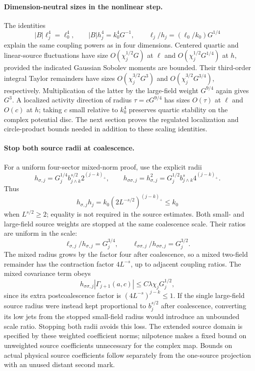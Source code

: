 \documentclass[11pt]{article}
\begin{document}
\paragraph{Dimension-neutral sizes in the nonlinear step.}
The identities
\[
 |B|\ell_j^4=\ell_0^4,\qquad
 |B|h_j^4=k_0^4G^{-1},\qquad
 \ell_j/h_j=(\ell_0/k_0)G^{1/4}
\]
explain the same coupling powers as in four dimensions. Centered
quartic and linear-source fluctuations have size
\(O(\chi_j^{1/2}G)\) at \(\ell\) and
\(O(\chi_j^{1/2}G^{1/4})\) at \(h\), provided the indicated Gaussian
Sobolev moments are bounded. Their third-order integral Taylor
remainders have sizes
\(O(\chi_j^{3/2}G^3)\) and
\(O(\chi_j^{3/2}G^{3/4})\), respectively. Multiplication of the latter
by the large-field weight \(G^{9/4}\) again gives \(G^3\).
A localized activity direction of radius \(\tau=cG^{9/4}\) has
sizes \(O(\tau)\) at \(\ell\) and \(O(c)\) at \(h\); taking \(c\)
small relative to \(k_0^4\) preserves quartic stability on the complex
potential disc. The next section proves the regulated localization and circle-product bounds needed in addition to these scaling identities.

\paragraph{Stop both source radii at coalescence.}
For a uniform four-sector mixed-norm proof, use the explicit radii
\[
 h_{\sigma,j}=G_j^{1/4}b_{j\wedge k}^{s/2}2^{(j-k)_+},\qquad
 h_{\sigma\sigma,j}=h_{\sigma,j}^2
       =G_j^{1/2}b_{j\wedge k}^{s}4^{(j-k)_+}.
\]
Thus
\[
 h_{\sigma,j}h_j=k_0(2L^{-s/2})^{(j-k)_+}\le k_0
\]
when \(L^{s/2}\ge2\); equality is not required in the source estimates.
Both small- and large-field source weights are stopped at the same
coalescence scale. Their ratios are uniform in the scale:
\[
 \ell_{\sigma,j}/h_{\sigma,j}=G_j^{3/4},\qquad
 \ell_{\sigma\sigma,j}/h_{\sigma\sigma,j}=G_j^{3/2}.
\]
The mixed radius grows by the factor four after coalescence, so a
mixed two-field remainder has the contraction factor \(4L^{-s}\),
up to adjacent coupling ratios. The mixed covariance term obeys
\[
 h_{\sigma\sigma,j}|\Gamma_{j+1}(a,c)|
       \le C\lambda\chi_jG_j^{1/2},
\]
since its extra postcoalescence factor is
\((4L^{-s})^{j-k}\le1\). If the single large-field source radius were
instead kept proportional to \(b_j^{s/2}\) after coalescence, converting
its low jets from the stopped small-field radius would introduce an
unbounded scale ratio. Stopping both radii avoids this loss.
The extended source domain is specified by these weighted coefficient
norms; nilpotence makes a fixed bound on unweighted source coefficients
unnecessary for the complex map. Bounds on actual physical source
coefficients follow separately from the one-source projection with an
unused distant second mark.
\end{document}
